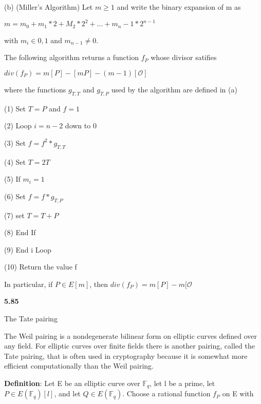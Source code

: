 \documentclass[titlepage]{article}
\begin{document}
(b) (Miller's Algorithm) Let $m \geq 1$ and write the binary expansion of m as 

\begin{center} 
$m = m_0 + m_1*2 + M_2*2^2 + ... + m_n-1 * 2^{n-1} $

with $m_i \in {0,1}$ and $m_{n-1} \neq 0.$ 
\end{center} 

The following algorithm returns a function $f_P$ whose divisor satifies 
\begin{center} 

$div(f_P) = m[P] -[mP]-(m-1)[\mathcal{O}]$

\end{center}

where the functions $g_{T,T}$ and $g_{T,P}$ used by the algorithm are defined in (a) 

(1) Set $T = P$ and $f = 1$

(2) Loop $i = n-2$ down to 0

\hspace{\parindent}	(3) Set $f=f^2*g_{T,T}$

\hspace{\parindent}	(4) Set $T=2T$

\hspace{\parindent}	(5) If $m_i = 1$

\hspace{\parindent}\hspace{\parindent}		(6) Set $f = f*g_{T,P}$

\hspace{\parindent}\hspace{\parindent}		(7) set $T=T+P$

\hspace{\parindent}	(8) End If

(9) End i Loop 

(10) Return the value f

In particular, if $P \in E[m]$, then $div(f_P) = m[P] - m[\mathcal{O}$


\textbf{5.85 }

The Tate pairing

The Weil pairing is a nondegenerate bilinear form on elliptic curves defined over any field. For elliptic curves over finite fields there is another pairing, called the Tate pairing, that is often used in cryptography because it is  somewhat more efficient computationally than the Weil pairing.

\textbf{Definition}: Let E be an elliptic curve over $\mathbb{F}_q$, let l be a prime, let $P \in E(\mathbb{F}_q)[l]$, and let $Q \in E(\mathbb{F}_q)$. Choose a rational function $f_P$ on E with 
\end{document}
